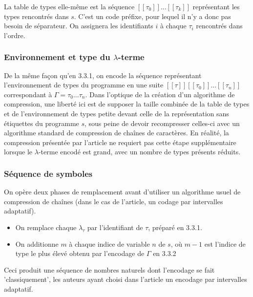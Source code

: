 \documentclass[titlepage]{article}
\providecommand{\tightlist}{%
  \setlength{\itemsep}{0pt}\setlength{\parskip}{0pt}}
\begin{document}
La table de types elle-même est la séquence
\([\![\tau_0]\!]...[\![\tau_{k}]\!]\) représentant les types rencontrés
dans \(s\). C'est un code préfixe, pour lequel il n'y a donc pas besoin
de séparateur. On assignera les identifiants \(i\) à chaque \(\tau_i\)
rencontrés dans l'ordre.

\subsubsection{\texorpdfstring{Environnement et type du
\(\lambda\)-terme}{Environnement et type du \textbackslash{}lambda-terme}}\label{environnement-et-type-du-lambda-terme}

De la même façon qu'en 3.3.1, on encode la séquence représentant
l'environnement de types du programme en une suite
\([\![\tau]\!][\![\tau_0]\!]...[\![\tau_{n}]\!]\) correspondant à
\(\Gamma = \tau_0...\tau_n\). Dans l'optique de la création d'un
algorithme de compression, une liberté ici est de supposer la taille
combinée de la table de types et de l'environnement de types petite
devant celle de la représentation sans étiquettes du programme \(s\),
sous peine de devoir recompresser celles-ci avec un algorithme standard
de compression de chaînes de caractères. En réalité, la compression
présentée par l'article ne requiert pas cette étape supplémentaire
lorsque le \(\lambda\)-terme encodé est grand, avec un nombre de types
présents réduits.

\subsubsection{Séquence de symboles}\label{suxe9quence-de-symboles}

On opère deux phases de remplacement avant d'utiliser un algorithme
usuel de compression de chaînes (dans le cas de l'article, un codage par
intervalles adaptatif).

\begin{itemize}
\tightlist
\item
  On remplace chaque \(\lambda_\tau\) par l'identifiant de \(\tau\),
  préparé en 3.3.1.
\item
  On additionne \(m\) à chaque indice de variable \(n\) de \(s\), où
  \(m-1\) est l'indice de type le plus élevé obtenu par l'encodage de
  \(\Gamma\) en 3.3.2
\end{itemize}

Ceci produit une séquence de nombres naturels dont l'encodage se fait
'classiquement', les auteurs ayant choisi dans l'article un encodage par intervalles
adaptatif.
\end{document}
